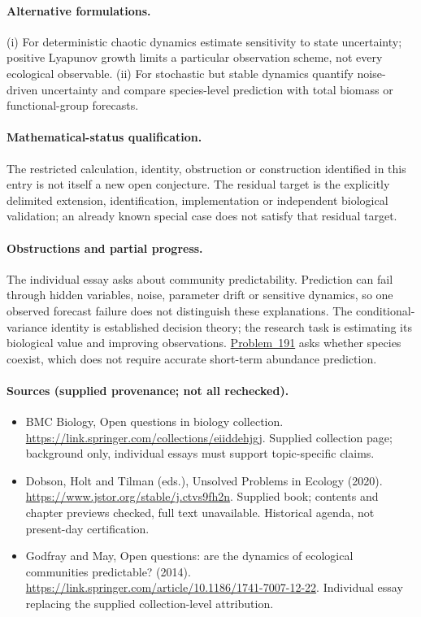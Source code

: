 \documentclass[11pt]{article}
\begin{document}
\paragraph{Alternative formulations.} (i) For deterministic chaotic dynamics estimate sensitivity to state uncertainty; positive Lyapunov growth limits a particular observation scheme, not every ecological observable. (ii) For stochastic but stable dynamics quantify noise-driven uncertainty and compare species-level prediction with total biomass or functional-group forecasts.
\paragraph{Mathematical-status qualification.} The restricted calculation, identity, obstruction or construction identified in this entry is not itself a new open conjecture. The residual target is the explicitly delimited extension, identification, implementation or independent biological validation; an already known special case does not satisfy that residual target.

\paragraph{Obstructions and partial progress.} The individual essay asks about community predictability. Prediction can fail through hidden variables, noise, parameter drift or sensitive dynamics, so one observed forecast failure does not distinguish these explanations. The conditional-variance identity is established decision theory; the research task is estimating its biological value and improving observations. \href{https://we-solve.github.io/problems/high-dimensional-coexistence-c500bcf4/}{Problem~191} asks whether species coexist, which does not require accurate short-term abundance prediction.
\paragraph{Sources (supplied provenance; not all rechecked).}
\begin{itemize}
\item BMC Biology, Open questions in biology collection. \url{https://link.springer.com/collections/eiiddehjgj}. Supplied collection page; background only, individual essays must support topic-specific claims.
\item Dobson, Holt and Tilman (eds.), Unsolved Problems in Ecology (2020). \url{https://www.jstor.org/stable/j.ctvs9fh2n}. Supplied book; contents and chapter previews checked, full text unavailable. Historical agenda, not present-day certification.
\item Godfray and May, Open questions: are the dynamics of ecological communities predictable? (2014). \url{https://link.springer.com/article/10.1186/1741-7007-12-22}. Individual essay replacing the supplied collection-level attribution.
\end{itemize}
\end{document}
